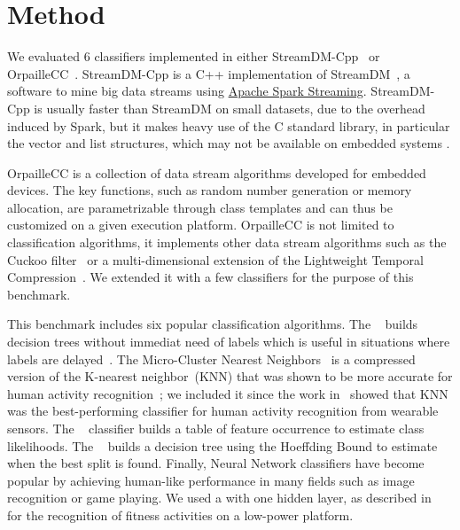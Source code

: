 \section{Method}
We evaluated 6 classifiers implemented in either
StreamDM-Cpp~\cite{StreamDM-CPP} or
OrpailleCC~\cite{OrpailleCC}.  StreamDM-Cpp is a
C++ implementation of StreamDM~\cite{StreamDM}, a
software to mine big data streams using
\href{https://spark.apache.org/streaming/}{Apache
Spark Streaming}. StreamDM-Cpp is usually faster
than StreamDM on small datasets, due to the
overhead induced by Spark, but it makes heavy use
of the C standard library, in particular the
vector and list structures, which may not be
available on embedded systems .

OrpailleCC is a collection of data stream
algorithms developed for embedded devices. The key
functions, such as random number generation or
memory allocation, are parametrizable through
class templates and can thus be customized on a
given execution platform.  OrpailleCC is not
limited to classification algorithms, it
implements other data stream algorithms such as
the Cuckoo filter~\cite{cuckoo} or a
multi-dimensional extension of the Lightweight
Temporal Compression~\cite{multi-ltc}. We extended
it with a few classifiers for the purpose of this
benchmark.

This benchmark includes six popular classification
algorithms.  The
\mondrianforest~\cite{mondrian2014} builds
decision trees without immediat need of labels
which is useful in situations where labels are
delayed~\cite{stream_learning_review}.  The
Micro-Cluster Nearest
Neighbors~\cite{mc-nn} is a compressed version of the K-nearest
neighbor~(KNN) that was shown to be more accurate for human activity
recognition~\cite{mc-nn}; we included
it since the work in~\cite{Janidarmian_2017} showed that KNN was the
best-performing classifier for human activity recognition from wearable
sensors.  The \naivebayes~\cite{naive_bayes}
classifier builds a table of feature
occurrence to estimate class
likelihoods.
The \hoeffdingtree~\cite{VFDT} builds a
decision tree using the Hoeffding Bound to
estimate when the best split is found. 
Finally, Neural Network classifiers have
become popular by achieving human-like performance in many fields such as image
recognition or game playing. We used a
\FNN with one hidden layer, as described in~\cite{omid_2019} for the recognition 
of fitness activities on a low-power platform.



